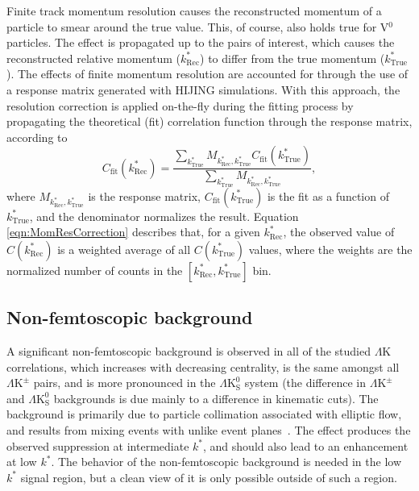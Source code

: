 \documentclass[ALICE,manyauthors]{cernphprep}
\newcommand{\kstar}{$k^{*}$\xspace}
\newcommand{\ktrue}{$k^{*}_{\mathrm{True}}$\xspace}
\newcommand{\krec}{$k^{*}_{\mathrm{Rec}}$\xspace}
\newcommand{\LamK}{$\Lambda$K\xspace}
\newcommand{\LamKpm}{$\Lambda\mathrm{K^{\pm}}$\xspace}
\newcommand{\LamKs}{$\Lambda\mathrm{K^{0}_{S}}$\xspace}
\newcommand{\Vz}{V$^{0}$\xspace}
\begin{document}
Finite track momentum resolution causes the reconstructed momentum of a particle to smear around the true value.
This, of course, also holds true for \Vz particles.
The effect is propagated up to the pairs of interest, which causes the reconstructed relative momentum (\krec) to differ from the true momentum (\ktrue).
The effects of finite momentum resolution are accounted for through the use of a response matrix generated with HIJING simulations.
With this approach, the resolution correction is applied on-the-fly during the fitting process by propagating the theoretical (fit) correlation function through the response matrix, according to
\begin{equation}
  C_{\mathrm{fit}}(k^{*}_{\mathrm{Rec}}) = \dfrac{\sum\limits_{k^{*}_{\mathrm{True}}}M_{k^{*}_{\mathrm{Rec}},k^{*}_{\mathrm{True}}}C_{\mathrm{fit}}(k^{*}_{\mathrm{True}})}{\sum\limits_{k^{*}_{\mathrm{True}}}M_{k^{*}_{\mathrm{Rec}},k^{*}_{\mathrm{True}}}},
\label{eqn:MomResCorrection}
\end{equation}
where $M_{k^{*}_{\mathrm{Rec}},k^{*}_{\mathrm{True}}}$ is the response matrix, $C_{\mathrm{fit}}(k^{*}_{\mathrm{True}})$ is the fit as a function of \ktrue, and the denominator normalizes the result.
Equation \ref{eqn:MomResCorrection} describes that, for a given \krec, the observed value of $C(k^{*}_{\mathrm{Rec}})$ is a weighted average of all $C(k^{*}_{\mathrm{True}})$ values, where the weights are the normalized number of counts in the \mbox{$[k^{*}_{\mathrm{Rec}}, k^{*}_{\mathrm{True}}]$} bin.


\subsection{Non-femtoscopic background}
\label{NonFlatBackground}

A significant non-femtoscopic background is observed in all of the studied \LamK correlations, which increases with decreasing centrality, is the same amongst all \LamKpm pairs, and is more pronounced in the \LamKs system (the difference in \LamKpm and \LamKs backgrounds is due mainly to a difference in kinematic cuts).  
The background is primarily due to particle collimation associated with elliptic flow, and results from mixing events with unlike event planes~\cite{Kisiel:2017}.
The effect produces the observed suppression at intermediate \kstar, and should also lead to an enhancement at low \kstar.
The behavior of the non-femtoscopic background is needed in the low \kstar signal region, but a clean view of it is only possible outside of such a region.
\end{document}
